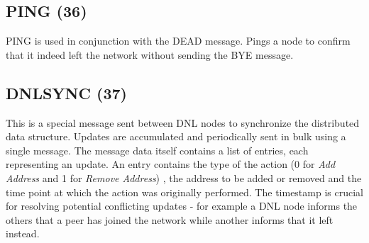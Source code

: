 \begin{figure}[H]
    \centering
\end{figure}

\subsection{PING (36)}

PING is used in conjunction with the DEAD message. Pings a node to confirm that
it indeed left the network without sending the BYE message.

\subsection{DNLSYNC (37)}

This is a special message sent between DNL nodes to synchronize the distributed 
data structure. Updates are accumulated and periodically sent in bulk using a 
single message. The message data itself contains a list of entries, each 
representing an update. An entry contains the type of the action (0 for 
\textit{Add Address} and 1 for \textit{Remove Address}) , the address to be 
added or removed and the time point at which the action was originally 
performed. The timestamp is crucial for resolving potential conflicting updates 
- for example a DNL node informs the others that a peer has joined the network 
while another informs that it left instead.

\begin{figure}[H]
    \centering
\end{figure}
